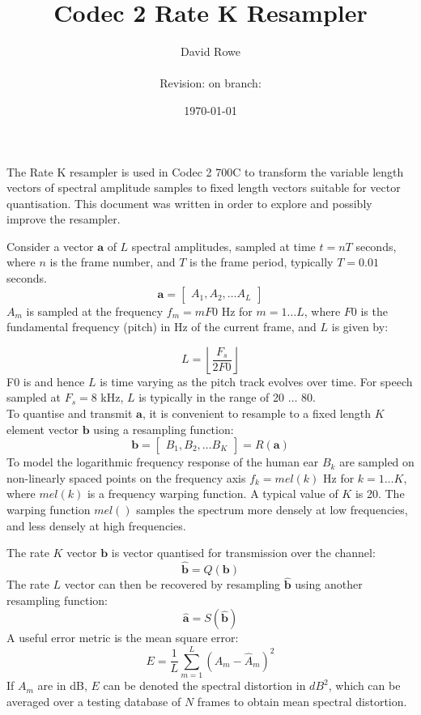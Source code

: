 \documentclass{article}
\title{Codec 2 Rate K Resampler}
\author{David Rowe\\ \\ Revision: {\gitrevision} on branch: {\branch}}
\date{\today}
\begin{document}
\maketitle

The Rate K resampler is used in Codec 2 700C to transform the variable length vectors of spectral amplitude samples to fixed length vectors suitable for vector quantisation.  This document was written in order to explore and possibly improve the resampler.

Consider a vector $\mathbf{a}$ of $L$ spectral amplitudes, sampled at time $t=nT$ seconds, where $n$ is the frame number, and $T$ is the frame period, typically $T=0.01$ seconds. 
\begin{equation}
\mathbf{a} = \begin{bmatrix} A_1, A_2, \ldots A_L \end{bmatrix} 
\end{equation}
$A_m$ is sampled at the frequency $f_m=mF0$ Hz for $m=1 \ldots L$, where $F0$ is the fundamental frequency (pitch) in Hz of the current frame, and $L$ is given by:

\begin{equation}
L=\left \lfloor \frac{F_s}{2F0} \right \rfloor
\end{equation}
F0 is and hence $L$ is time varying as the pitch track evolves over time. For speech sampled at $F_s=8$ kHz, $L$ is typically in the range of 20 $\ldots$ 80. \\

To quantise and transmit $\mathbf{a}$, it is convenient to resample to a fixed length $K$ element vector $\mathbf{b}$ using a resampling function:
\begin{equation}
\mathbf{b} = \begin{bmatrix} B_1, B_2, \ldots B_K \end{bmatrix} = R(\mathbf{a})
\end{equation}
To model the logarithmic frequency response of the human ear $B_k$  are sampled on non-linearly spaced points on the frequency axis $f_k=mel(k)$ Hz for $k=1 \ldots K$, where $mel(k)$ is a frequency warping function. A typical value of $K$ is 20. The warping function $mel()$ samples the spectrum more densely at low frequencies, and less densely at high frequencies.  

The rate $K$ vector $\mathbf{b}$ is vector quantised for transmission over the channel:
\begin{equation}
\hat{\mathbf{b}} = Q(\mathbf{b})
\end{equation}
The rate $L$ vector can then be recovered by resampling $\mathbf{\hat{b}}$ using another resampling function:
\begin{equation}
\hat{\mathbf{a}} = S(\hat{\mathbf{b}})
\end{equation}
A useful error metric is the mean square error:
\begin{equation}
E=\frac{1}{L}\sum_{m=1}^{L}(A_m-\hat{A}_m)^2
\end{equation}
If $A_m$ are in dB, $E$ can be denoted the spectral distortion in $dB^2$, which can be averaged over a testing database of $N$ frames to obtain mean spectral distortion.
\end{document}
